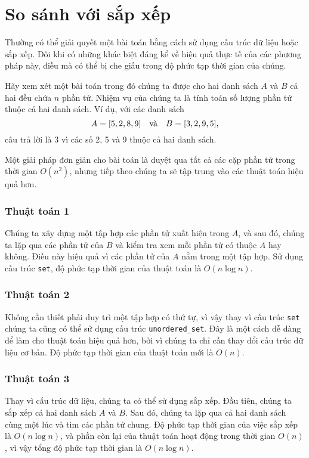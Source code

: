 \section{So sánh với sắp xếp}

Thường có thể giải quyết một bài toán
bằng cách sử dụng cấu trúc dữ liệu hoặc sắp xếp.
Đôi khi có những khác biệt đáng kể
về hiệu quả thực tế của các phương pháp này,
điều mà có thể bị che giấu trong độ phức tạp thời gian của chúng.

Hãy xem xét một bài toán trong đó
chúng ta được cho hai danh sách $A$ và $B$
cả hai đều chứa $n$ phần tử.
Nhiệm vụ của chúng ta là tính toán số lượng phần tử
thuộc cả hai danh sách.
Ví dụ, với các danh sách
\[A = [5,2,8,9] \hspace{10px} \textrm{và} \hspace{10px} B = [3,2,9,5],\]
câu trả lời là 3 vì các số 2, 5
và 9 thuộc cả hai danh sách.

Một giải pháp đơn giản cho bài toán là
duyệt qua tất cả các cặp phần tử trong thời gian $O(n^2)$,
nhưng tiếp theo chúng ta sẽ tập trung vào
các thuật toán hiệu quả hơn.

\subsubsection{Thuật toán 1}

Chúng ta xây dựng một tập hợp các phần tử xuất hiện trong $A$,
và sau đó, chúng ta lặp qua các phần tử
của $B$ và kiểm tra xem mỗi phần tử có
thuộc $A$ hay không.
Điều này hiệu quả vì các phần tử của $A$
nằm trong một tập hợp.
Sử dụng cấu trúc \texttt{set},
độ phức tạp thời gian của thuật toán là $O(n \log n)$.

\subsubsection{Thuật toán 2}

Không cần thiết phải duy trì một tập hợp có thứ tự,
vì vậy thay vì cấu trúc \texttt{set}
chúng ta cũng có thể sử dụng cấu trúc \texttt{unordered\_set}.
Đây là một cách dễ dàng để làm cho thuật toán
hiệu quả hơn, bởi vì chúng ta chỉ cần thay đổi
cấu trúc dữ liệu cơ bản.
Độ phức tạp thời gian của thuật toán mới là $O(n)$.

\subsubsection{Thuật toán 3}

Thay vì cấu trúc dữ liệu, chúng ta có thể sử dụng sắp xếp.
Đầu tiên, chúng ta sắp xếp cả hai danh sách $A$ và $B$.
Sau đó, chúng ta lặp qua cả hai danh sách
cùng một lúc và tìm các phần tử chung.
Độ phức tạp thời gian của việc sắp xếp là $O(n \log n)$,
và phần còn lại của thuật toán hoạt động trong thời gian $O(n)$,
vì vậy tổng độ phức tạp thời gian là $O(n \log n)$.

